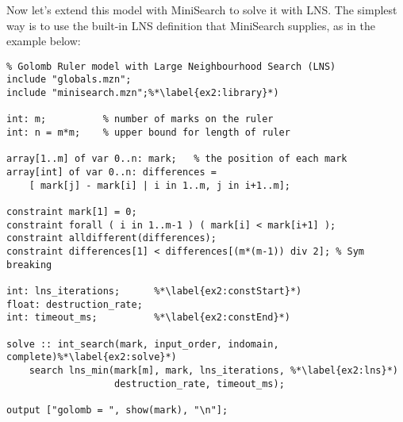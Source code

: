 \documentclass[a4paper,13pt,onecolumn]{article}%
\begin{document}
Now let's extend this model with MiniSearch to solve it with LNS.
The simplest way is to use the built-in LNS definition that MiniSearch supplies, as in the example below:
\begin{lstlisting}
% Golomb Ruler model with Large Neighbourhood Search (LNS)
include "globals.mzn";
include "minisearch.mzn";%*\label{ex2:library}*)

int: m;          % number of marks on the ruler
int: n = m*m;    % upper bound for length of ruler

array[1..m] of var 0..n: mark;   % the position of each mark
array[int] of var 0..n: differences =
    [ mark[j] - mark[i] | i in 1..m, j in i+1..m];

constraint mark[1] = 0;
constraint forall ( i in 1..m-1 ) ( mark[i] < mark[i+1] );
constraint alldifferent(differences);   
constraint differences[1] < differences[(m*(m-1)) div 2]; % Sym breaking

int: lns_iterations;      %*\label{ex2:constStart}*)
float: destruction_rate;  
int: timeout_ms;          %*\label{ex2:constEnd}*)

solve :: int_search(mark, input_order, indomain, complete)%*\label{ex2:solve}*)
    search lns_min(mark[m], mark, lns_iterations, %*\label{ex2:lns}*)
                   destruction_rate, timeout_ms);

output ["golomb = ", show(mark), "\n"];
\end{lstlisting}
\end{document}
